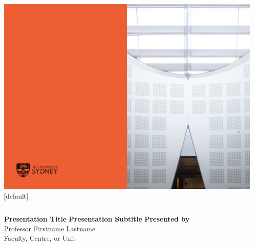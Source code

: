\documentclass{beamer}
\begin{document}

{\includegraphics[width=\paperwidth,height=\paperheight]{titlebgstd2jun16.pdf}}
[default]

\begin{frame}
\vspace{2cm}
\begin{columns}
\column{5.5cm}
{\bf{\color{usydwhite}Presentation Title}}	%
\vspace{1cm}
{\bf Presentation Subtitle}					%
{\bf Presented by} \\
Professor Firstname Lastname \\				%
Faculty, Centre, or Unit					%

\column{6cm}
\end{columns}
\end{frame}

\end{document}
